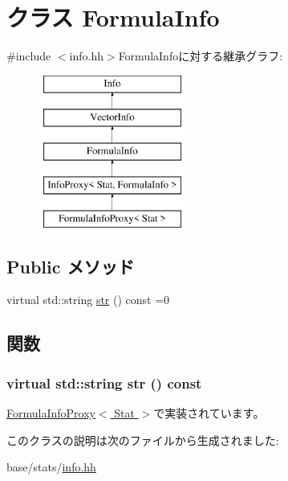 \hypertarget{classStats_1_1FormulaInfo}{
\section{クラス FormulaInfo}
\label{classStats_1_1FormulaInfo}
}


{\ttfamily \#include $<$info.hh$>$}FormulaInfoに対する継承グラフ:\begin{figure}[H]
\begin{center}
\leavevmode
\includegraphics[height=5cm]{classStats_1_1FormulaInfo}
\end{center}
\end{figure}
\subsection*{Public メソッド}
\begin{DoxyCompactItemize}
\item 
virtual std::string \hyperlink{classStats_1_1FormulaInfo_a6522bc65bd97a6b1ef6cdfe78462a919}{str} () const =0
\end{DoxyCompactItemize}


\subsection{関数}
\hypertarget{classStats_1_1FormulaInfo_a6522bc65bd97a6b1ef6cdfe78462a919}{
\subsubsection[{str}]{\setlength{\rightskip}{0pt plus 5cm}virtual std::string str () const}}
\label{classStats_1_1FormulaInfo_a6522bc65bd97a6b1ef6cdfe78462a919}


\hyperlink{classStats_1_1FormulaInfoProxy_a1b9b8885b0880fc4ddf9a2c7d1ca3dc4}{FormulaInfoProxy$<$ Stat $>$}で実装されています。

このクラスの説明は次のファイルから生成されました:\begin{DoxyCompactItemize}
\item 
base/stats/\hyperlink{info_8hh}{info.hh}\end{DoxyCompactItemize}
